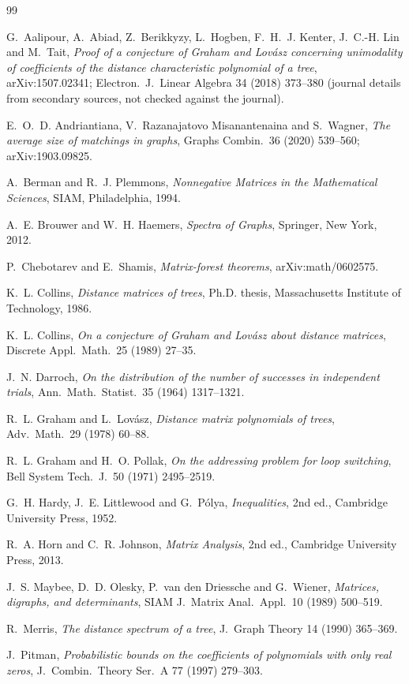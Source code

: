 \documentclass[11pt]{amsart}
\theoremstyle{definition}
\theoremstyle{remark}
\begin{document}
\begin{thebibliography}{99}

G.~Aalipour, A.~Abiad, Z.~Berikkyzy, L.~Hogben, F.~H.~J. Kenter, J.~C.-H. Lin
and M.~Tait, \emph{Proof of a conjecture of Graham and Lov\'asz concerning
unimodality of coefficients of the distance characteristic polynomial of a
tree}, arXiv:1507.02341; Electron.\ J.\ Linear Algebra 34 (2018) 373--380
(journal details from secondary sources, not checked against the journal).

E.~O.~D. Andriantiana, V.~Razanajatovo Misanantenaina and S.~Wagner,
\emph{The average size of matchings in graphs}, Graphs Combin.\ 36 (2020)
539--560; arXiv:1903.09825.

A.~Berman and R.~J. Plemmons, \emph{Nonnegative Matrices in the
Mathematical Sciences}, SIAM, Philadelphia, 1994.

A.~E. Brouwer and W.~H. Haemers, \emph{Spectra of Graphs}, Springer, New
York, 2012.

P.~Chebotarev and E.~Shamis, \emph{Matrix-forest theorems},
arXiv:math/0602575.

K.~L. Collins, \emph{Distance matrices of trees}, Ph.D. thesis,
Massachusetts Institute of Technology, 1986.

K.~L. Collins, \emph{On a conjecture of Graham and Lov\'asz about distance
matrices}, Discrete Appl.\ Math.\ 25 (1989) 27--35.

J.~N. Darroch, \emph{On the distribution of the number of successes in
independent trials}, Ann.\ Math.\ Statist.\ 35 (1964) 1317--1321.

R.~L. Graham and L.~Lov\'asz, \emph{Distance matrix polynomials of trees},
Adv.\ Math.\ 29 (1978) 60--88.

R.~L. Graham and H.~O. Pollak, \emph{On the addressing problem for loop
switching}, Bell System Tech.\ J.\ 50 (1971) 2495--2519.

G.~H. Hardy, J.~E. Littlewood and G.~P\'olya, \emph{Inequalities}, 2nd ed.,
Cambridge University Press, 1952.

R.~A. Horn and C.~R. Johnson, \emph{Matrix Analysis}, 2nd ed., Cambridge
University Press, 2013.

J.~S. Maybee, D.~D. Olesky, P.~van den Driessche and G.~Wiener,
\emph{Matrices, digraphs, and determinants}, SIAM J.\ Matrix Anal.\ Appl.\
10 (1989) 500--519.

R.~Merris, \emph{The distance spectrum of a tree}, J.\ Graph Theory 14
(1990) 365--369.

J.~Pitman, \emph{Probabilistic bounds on the coefficients of polynomials
with only real zeros}, J.\ Combin.\ Theory Ser.\ A 77 (1997) 279--303.

\end{thebibliography}
\end{document}
